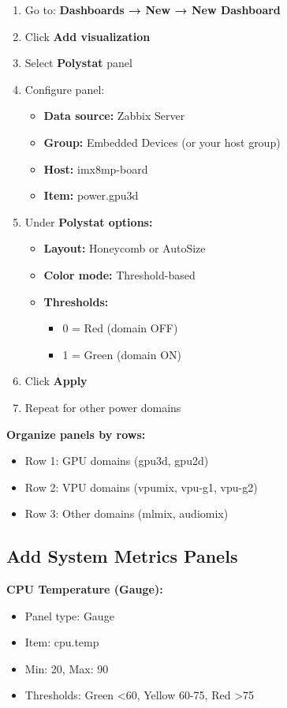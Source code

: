 \documentclass[12pt,a4paper]{report}
\begin{document}
\begin{enumerate}
    \item Go to: \textbf{Dashboards → New → New Dashboard}
    \item Click \textbf{Add visualization}
    \item Select \textbf{Polystat} panel
    \item Configure panel:
    \begin{itemize}
        \item \textbf{Data source:} Zabbix Server
        \item \textbf{Group:} Embedded Devices (or your host group)
        \item \textbf{Host:} imx8mp-board
        \item \textbf{Item:} power.gpu3d
    \end{itemize}
    \item Under \textbf{Polystat options:}
    \begin{itemize}
        \item \textbf{Layout:} Honeycomb or AutoSize
        \item \textbf{Color mode:} Threshold-based
        \item \textbf{Thresholds:}
        \begin{itemize}
            \item 0 = Red (domain OFF)
            \item 1 = Green (domain ON)
        \end{itemize}
    \end{itemize}
    \item Click \textbf{Apply}
    \item Repeat for other power domains
\end{enumerate}

\textbf{Organize panels by rows:}
\begin{itemize}
    \item Row 1: GPU domains (gpu3d, gpu2d)
    \item Row 2: VPU domains (vpumix, vpu-g1, vpu-g2)
    \item Row 3: Other domains (mlmix, audiomix)
\end{itemize}

\subsection{Add System Metrics Panels}

\textbf{CPU Temperature (Gauge):}
\begin{itemize}
    \item Panel type: Gauge
    \item Item: cpu.temp
    \item Min: 20, Max: 90
    \item Thresholds: Green <60, Yellow 60-75, Red >75
\end{itemize}
\end{document}
